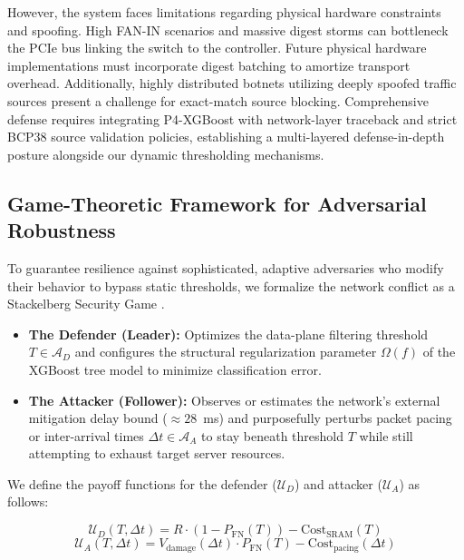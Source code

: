 \documentclass[sigconf, nonacm]{acmart}
\begin{document}
However, the system faces limitations regarding physical hardware constraints and spoofing. High FAN-IN scenarios and massive digest storms can bottleneck the PCIe bus linking the switch to the controller. Future physical hardware implementations must incorporate digest batching to amortize transport overhead. Additionally, highly distributed botnets utilizing deeply spoofed traffic sources present a challenge for exact-match source blocking. Comprehensive defense requires integrating P4-XGBoost with network-layer traceback and strict BCP38 source validation policies, establishing a multi-layered defense-in-depth posture alongside our dynamic thresholding mechanisms.

\subsection{Game-Theoretic Framework for Adversarial Robustness}
To guarantee resilience against sophisticated, adaptive adversaries who modify their behavior to bypass static thresholds, we formalize the network conflict as a Stackelberg Security Game \cite{yang2021}.

\begin{itemize}
    \item \textbf{The Defender (Leader):} Optimizes the data-plane filtering threshold $T \in \mathcal{A}_D$ and configures the structural regularization parameter $\Omega(f)$ of the XGBoost tree model to minimize classification error.
    \item \textbf{The Attacker (Follower):} Observes or estimates the network's external mitigation delay bound ($\approx 28$~ms) and purposefully perturbs packet pacing or inter-arrival times $\Delta t \in \mathcal{A}_A$ to stay beneath threshold $T$ while still attempting to exhaust target server resources.
\end{itemize}

We define the payoff functions for the defender ($\mathcal{U}_D$) and attacker ($\mathcal{U}_A$) as follows:

\begin{equation}
\mathcal{U}_D(T, \Delta t) = R \cdot (1 - P_{\text{FN}}(T)) - \text{Cost}_{\text{SRAM}}(T)
\end{equation}
\begin{equation}
\mathcal{U}_A(T, \Delta t) = V_{\text{damage}}(\Delta t) \cdot P_{\text{FN}}(T) - \text{Cost}_{\text{pacing}}(\Delta t)
\end{equation}
\end{document}
